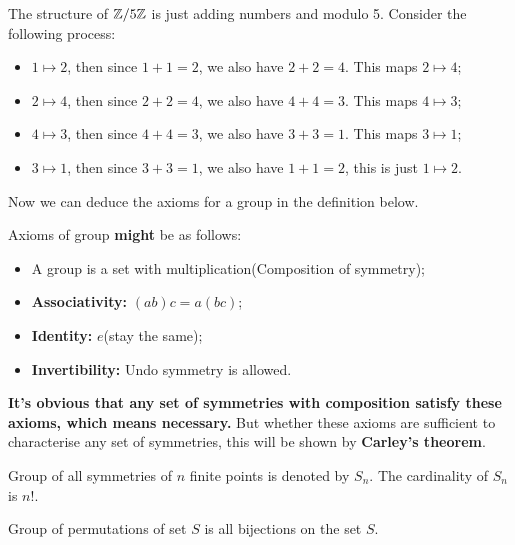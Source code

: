 \documentclass[11pt]{article}
\begin{document}
\begin{examplle}[Symmetry of \(\Z/5\Z\)]
The structure of \(\Z/5\Z\) is just adding numbers and modulo 5. Consider the following process:
\begin{itemize}
\item \(1 \mapsto 2\), then since \(1 + 1 = 2\), we also have \(2 + 2 = 4\). This maps \(2 \mapsto 4\);
\item \(2 \mapsto 4\), then since \(2 + 2 = 4\), we also have \(4 + 4 = 3\). This maps \(4 \mapsto 3\);
\item \(4 \mapsto 3\), then since \(4 + 4 = 3\), we also have \(3 + 3 = 1\). This maps \(3 \mapsto 1\);
\item \(3 \mapsto 1\), then since \(3 + 3 = 1\), we also have \(1 + 1 = 2\), this is just \(1 \mapsto 2\).
\end{itemize}
\end{examplle}

Now we can deduce the axioms for a group in the definition below.

\begin{definition}
Axioms of group \textbf{might} be as follows:
\begin{itemize}
\item A group is a set with multiplication(Composition of symmetry);
\item \textbf{Associativity:} \((ab)c = a(bc)\);
\item \textbf{Identity:} \(e\)(stay the same);
\item \textbf{Invertibility:} Undo symmetry is allowed.
\end{itemize}
\end{definition}

\textbf{It's obvious that any set of symmetries with composition satisfy these axioms, which means necessary.} But whether these axioms are sufficient to characterise any set of symmetries, this will be shown by \textbf{Carley's theorem}.

\begin{definition}
Group of all symmetries of \(n\) finite points is denoted by \(S_n\). The cardinality of \(S_n\) is \(n!\).
\end{definition}

\begin{definition}
Group of permutations of set \(S\) is all bijections on the set \(S\).
\end{definition}
\end{document}
